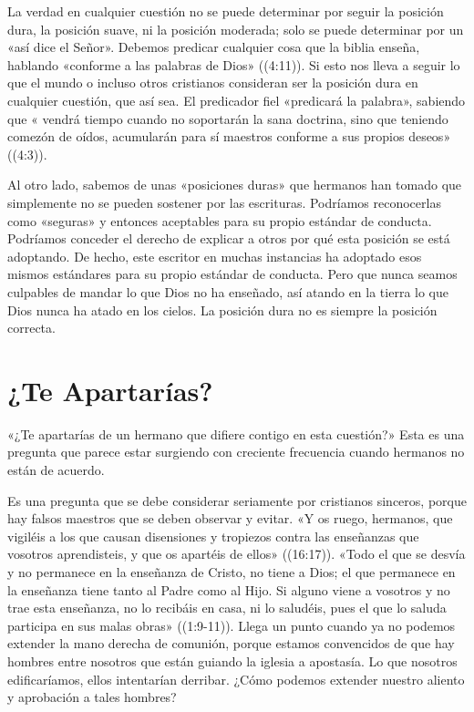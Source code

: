 \documentclass[12pt, twoside, openright]{book}
\begin{document}
La verdad en cualquier cuestión no se puede determinar por seguir la posición dura, la posición suave, ni la posición moderada; solo se puede determinar por un «así dice el Señor». Debemos predicar cualquier cosa que la biblia enseña, hablando «conforme a las palabras de Dios» ((4:11)). Si esto nos lleva a seguir lo que el mundo o incluso otros cristianos consideran ser la posición dura en cualquier cuestión, que así sea. El predicador fiel «predicará la palabra», sabiendo que « vendrá tiempo cuando no soportarán la sana doctrina, sino que teniendo comezón de oídos, acumularán para sí maestros conforme a sus propios deseos» ((4:3)).

Al otro lado, sabemos de unas «posiciones duras» que hermanos han tomado que simplemente no se pueden sostener por las escrituras. Podríamos reconocerlas como «seguras» y entonces aceptables para su propio estándar de conducta. Podríamos conceder el derecho de explicar a otros por qué esta posición se está adoptando. De hecho, este escritor en muchas instancias ha adoptado esos mismos estándares para su propio estándar de conducta. Pero que nunca seamos culpables de mandar lo que Dios no ha enseñado, así atando en la tierra lo que Dios nunca ha atado en los cielos. La posición dura no es siempre la posición correcta.

\section{¿Te Apartarías?}
«¿Te apartarías de un hermano que difiere contigo en esta cuestión?» Esta es una pregunta que parece estar surgiendo con creciente frecuencia cuando hermanos no están de acuerdo.

Es una pregunta que se debe considerar seriamente por cristianos sinceros, porque hay falsos maestros que se deben observar y evitar. «Y os ruego, hermanos, que vigiléis a los que causan disensiones y tropiezos contra las enseñanzas que vosotros aprendisteis, y que os apartéis de ellos» ((16:17)). «Todo el que se desvía y no permanece en la enseñanza de Cristo, no tiene a Dios; el que permanece en la enseñanza tiene tanto al Padre como al Hijo. Si alguno viene a vosotros y no trae esta enseñanza, no lo recibáis en casa, ni lo saludéis, pues el que lo saluda participa en sus malas obras» ((1:9-11)). Llega un punto cuando ya no podemos extender la mano derecha de comunión, porque estamos convencidos de que hay hombres entre nosotros que están guiando la iglesia a apostasía. Lo que nosotros edificaríamos, ellos intentarían derribar. ¿Cómo podemos extender nuestro aliento y aprobación a tales hombres?
\end{document}
